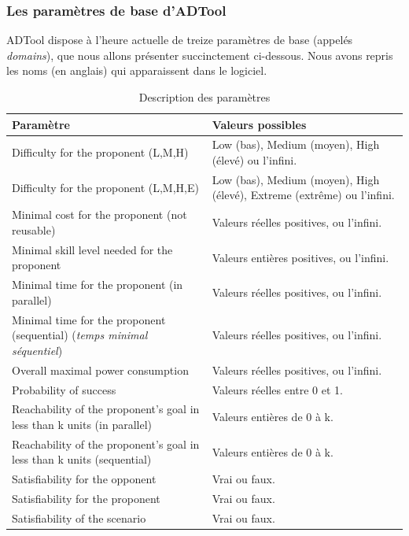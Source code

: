 \subsubsection{Les paramètres de base d'ADTool}

ADTool dispose à l'heure actuelle de treize paramètres de base (appelés \textit{domains}), que nous allons présenter succinctement ci-dessous. Nous avons repris les noms (en anglais) qui apparaissent dans le logiciel. 
		
\begin{table}[!h]
	\centering
	\begin{tabular}{|p{6cm}|p{5cm}|}
  \hline
  \textbf{Paramètre} & \textbf{Valeurs possibles} \\
  \hline
  Difficulty for the proponent (L,M,H) & 
 Low (bas), Medium (moyen), High (élevé) ou l'infini.
\\ \hline
Difficulty for the proponent (L,M,H,E) & 
Low (bas), Medium (moyen), High (élevé), Extreme (extrême) ou l'infini.
\\ \hline
Minimal cost for the proponent (not reusable) & 
Valeurs réelles positives, ou l'infini.\\ \hline
  Minimal skill level needed for the proponent
  & Valeurs entières positives, ou l'infini.\\ \hline
  Minimal time for the proponent (in parallel)
  & Valeurs réelles positives, ou l'infini.\\ \hline
  Minimal time for the proponent (sequential) (\textit{temps minimal séquentiel})
  & Valeurs réelles positives, ou l'infini.\\ \hline
  Overall maximal power consumption & 
  Valeurs réelles positives, ou l'infini.\\ \hline
  Probability of success &
  Valeurs réelles entre 0 et 1.\\ \hline
  Reachability of the proponent's goal in less than k units (in parallel)
  & Valeurs entières de 0 à k. \\ \hline
  Reachability of the proponent's goal in less than k units (sequential)
  & Valeurs entières de 0 à k. \\ \hline
  Satisfiability for the opponent
  & Vrai ou faux. \\ \hline
  Satisfiability for the proponent
  & Vrai ou faux. \\ \hline
  Satisfiability of the scenario
  & Vrai ou faux. \\
  \hline
\end{tabular}
	\caption{Description des paramètres}
	\label{tab:DescriptionParam}
\end{table}

